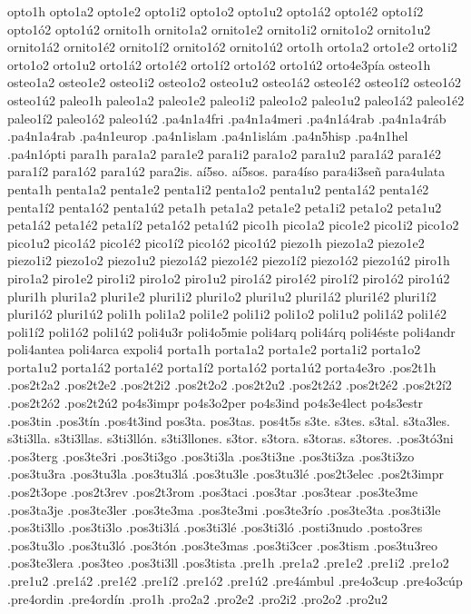 {opto1h
opto1a2 opto1e2 opto1i2 opto1o2 opto1u2
opto1á2 opto1é2 opto1í2 opto1ó2 opto1ú2
ornito1h
ornito1a2 ornito1e2 ornito1i2 ornito1o2 ornito1u2
ornito1á2 ornito1é2 ornito1í2 ornito1ó2 ornito1ú2
orto1h
orto1a2 orto1e2 orto1i2 orto1o2 orto1u2
orto1á2 orto1é2 orto1í2 orto1ó2 orto1ú2
orto4e3pía
osteo1h
osteo1a2 osteo1e2 osteo1i2 osteo1o2 osteo1u2
osteo1á2 osteo1é2 osteo1í2 osteo1ó2 osteo1ú2
paleo1h
paleo1a2 paleo1e2 paleo1i2 paleo1o2 paleo1u2
paleo1á2 paleo1é2 paleo1í2 paleo1ó2 paleo1ú2
.pa4n1a4fri
.pa4n1a4meri
.pa4n1á4rab
.pa4n1a4ráb
.pa4n1a4rab
.pa4n1europ
.pa4n1islam
.pa4n1islám
.pa4n5hisp
.pa4n1hel
.pa4n1ópti
para1h
para1a2 para1e2 para1i2 para1o2 para1u2
para1á2 para1é2 para1í2 para1ó2 para1ú2
para2is.
aí5so.
aí5sos.
para4íso
para4i3señ
para4ulata
penta1h
penta1a2 penta1e2 penta1i2 penta1o2 penta1u2
penta1á2 penta1é2 penta1í2 penta1ó2 penta1ú2
peta1h
peta1a2 peta1e2 peta1i2 peta1o2 peta1u2
peta1á2 peta1é2 peta1í2 peta1ó2 peta1ú2
pico1h
pico1a2 pico1e2 pico1i2 pico1o2 pico1u2
pico1á2 pico1é2 pico1í2 pico1ó2 pico1ú2
piezo1h
piezo1a2 piezo1e2 piezo1i2 piezo1o2 piezo1u2
piezo1á2 piezo1é2 piezo1í2 piezo1ó2 piezo1ú2
piro1h
piro1a2 piro1e2 piro1i2 piro1o2 piro1u2
piro1á2 piro1é2 piro1í2 piro1ó2 piro1ú2
pluri1h
pluri1a2 pluri1e2 pluri1i2 pluri1o2 pluri1u2
pluri1á2 pluri1é2 pluri1í2 pluri1ó2 pluri1ú2
poli1h
poli1a2 poli1e2 poli1i2 poli1o2 poli1u2
poli1á2 poli1é2 poli1í2 poli1ó2 poli1ú2
poli4u3r
poli4o5mie
poli4arq
poli4árq
poli4éste
poli4andr
poli4antea
poli4arca
expoli4
porta1h
porta1a2 porta1e2 porta1i2 porta1o2 porta1u2
porta1á2 porta1é2 porta1í2 porta1ó2 porta1ú2
porta4e3ro
.pos2t1h
.pos2t2a2 .pos2t2e2 .pos2t2i2 .pos2t2o2 .pos2t2u2
.pos2t2á2 .pos2t2é2 .pos2t2í2 .pos2t2ó2 .pos2t2ú2
po4s3impr
po4s3o2per
po4s3ind
po4s3e4lect
po4s3estr
.pos3tin
.pos3tín
.pos4t3ind
pos3ta.
pos3tas.
pos4t5s
s3te.
s3tes.
s3tal.
s3ta3les.
s3ti3lla.
s3ti3llas.
s3ti3llón.
s3ti3llones.
s3tor.
s3tora.
s3toras.
s3tores.
.pos3tó3ni
.pos3terg
.pos3te3ri
.pos3ti3go
.pos3ti3la
.pos3ti3ne
.pos3ti3za
.pos3ti3zo
.pos3tu3ra
.pos3tu3la
.pos3tu3lá
.pos3tu3le
.pos3tu3lé
.pos2t3elec
.pos2t3impr
.pos2t3ope
.pos2t3rev
.pos2t3rom
.pos3taci
.pos3tar
.pos3tear
.pos3te3me
.pos3ta3je
.pos3te3ler
.pos3te3ma
.pos3te3mi
.pos3te3río
.pos3te3ta
.pos3ti3le
.pos3ti3llo
.pos3ti3lo
.pos3ti3lá
.pos3ti3lé
.pos3ti3ló
.posti3nudo
.posto3res
.pos3tu3lo
.pos3tu3ló
.pos3tón
.pos3te3mas
.pos3ti3cer
.pos3tism
.pos3tu3reo
.pos3te3lera
.pos3teo
.pos3ti3ll
.pos3tista
.pre1h
.pre1a2 .pre1e2 .pre1i2 .pre1o2 .pre1u2
.pre1á2 .pre1é2 .pre1í2 .pre1ó2 .pre1ú2
.pre4ámbul
.pre4o3cup
.pre4o3cúp
.pre4ordin
.pre4ordín
.pro1h
.pro2a2 .pro2e2 .pro2i2 .pro2o2 .pro2u2
}
